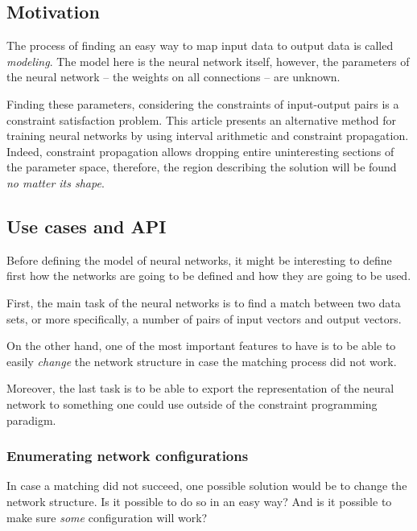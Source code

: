 \documentclass[a4paper, 10pt]{article}
\begin{document}

\subsection*{Motivation}

The process of finding an easy way to map input data to output data is called
\emph{modeling}. The model here is the neural network itself, however, the
parameters of the neural network -- the weights on all connections -- are unknown. 

Finding these parameters, considering the constraints of input-output pairs is a
constraint satisfaction problem. This article presents an alternative method for
training neural networks by using interval arithmetic and constraint
propagation. Indeed, constraint propagation allows dropping entire uninteresting
sections of the parameter space, therefore, the region describing the solution
will be found \emph{no matter its shape}.

\subsection*{Use cases and API} 

Before defining the model of neural networks, it might be interesting to
define first how the networks are going to be defined and how they are
going to be used.

First, the main task of the neural networks is to find a match between two data
sets, or more specifically, a number of pairs of input vectors and output
vectors.

On the other hand, one of the most important features to have is to be able to
easily \emph{change} the network structure in case the matching process did not
work. 

Moreover, the last task is to be able to export the representation of the neural
network to something one could use outside of the constraint programming
paradigm.

\subsubsection*{Enumerating network configurations}
In case a matching did not succeed, one possible solution would be to change the
network structure. Is it possible to do so in an easy way? And is it possible to
make sure \emph{some} configuration will work?
\end{document}
